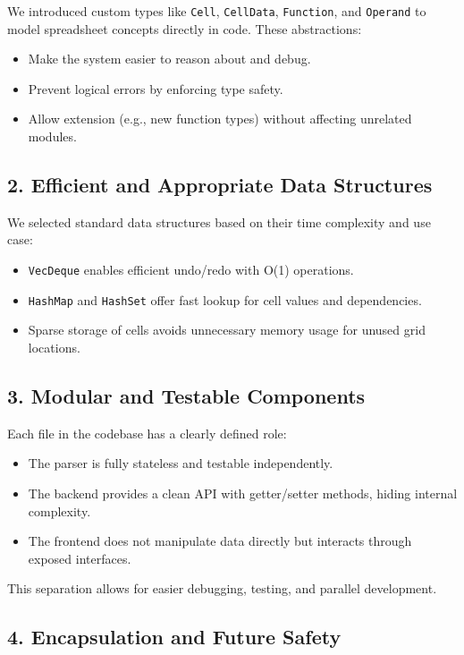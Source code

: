 \documentclass{article}
\begin{document}
We introduced custom types like \texttt{Cell}, \texttt{CellData}, \texttt{Function}, and \texttt{Operand} to model spreadsheet concepts directly in code. These abstractions:
\begin{itemize}
    \item Make the system easier to reason about and debug.
    \item Prevent logical errors by enforcing type safety.
    \item Allow extension (e.g., new function types) without affecting unrelated modules.
\end{itemize}

\subsection*{2. Efficient and Appropriate Data Structures}

We selected standard data structures based on their time complexity and use case:
\begin{itemize}
    \item \texttt{VecDeque} enables efficient undo/redo with O(1) operations.
    \item \texttt{HashMap} and \texttt{HashSet} offer fast lookup for cell values and dependencies.
    \item Sparse storage of cells avoids unnecessary memory usage for unused grid locations.
\end{itemize}

\subsection*{3. Modular and Testable Components}

Each file in the codebase has a clearly defined role:
\begin{itemize}
    \item The parser is fully stateless and testable independently.
    \item The backend provides a clean API with getter/setter methods, hiding internal complexity.
    \item The frontend does not manipulate data directly but interacts through exposed interfaces.
\end{itemize}
This separation allows for easier debugging, testing, and parallel development.

\subsection*{4. Encapsulation and Future Safety}
\end{document}

